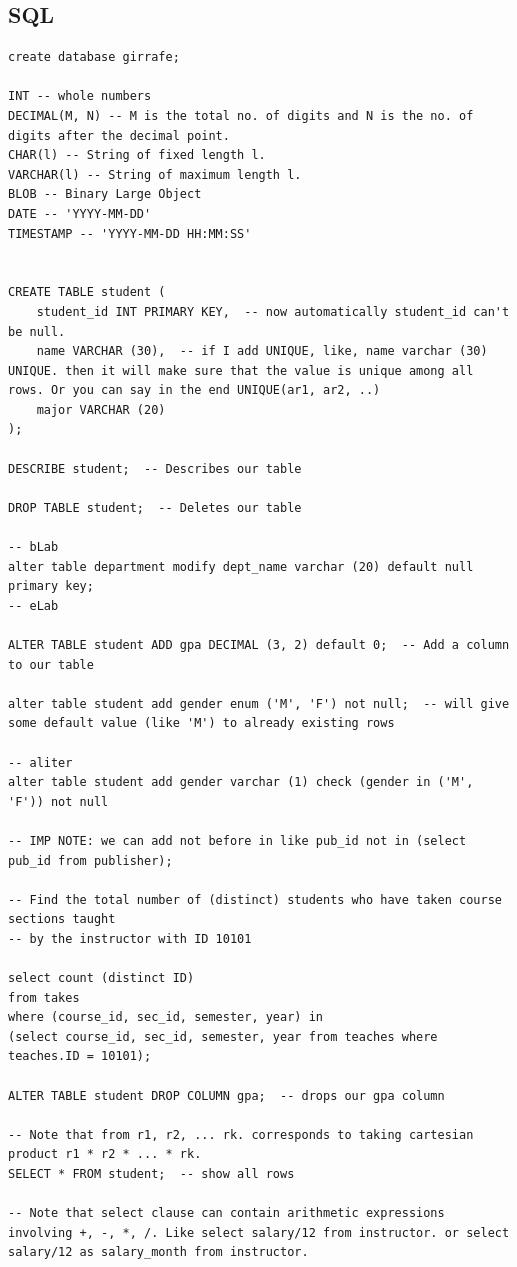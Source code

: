 \documentclass[8pt, a4paper, oneside, twocolumn]{extarticle}
\begin{document}
\subsection{SQL}
\begin{verbatim}
create database girrafe;

INT -- whole numbers
DECIMAL(M, N) -- M is the total no. of digits and N is the no. of digits after the decimal point.
CHAR(l) -- String of fixed length l.
VARCHAR(l) -- String of maximum length l.
BLOB -- Binary Large Object
DATE -- 'YYYY-MM-DD'
TIMESTAMP -- 'YYYY-MM-DD HH:MM:SS'


CREATE TABLE student (
    student_id INT PRIMARY KEY,  -- now automatically student_id can't be null.
    name VARCHAR (30),  -- if I add UNIQUE, like, name varchar (30) UNIQUE. then it will make sure that the value is unique among all rows. Or you can say in the end UNIQUE(ar1, ar2, ..)
    major VARCHAR (20)
);

DESCRIBE student;  -- Describes our table

DROP TABLE student;  -- Deletes our table

-- bLab
alter table department modify dept_name varchar (20) default null primary key;
-- eLab

ALTER TABLE student ADD gpa DECIMAL (3, 2) default 0;  -- Add a column to our table

alter table student add gender enum ('M', 'F') not null;  -- will give some default value (like 'M') to already existing rows

-- aliter
alter table student add gender varchar (1) check (gender in ('M', 'F')) not null

-- IMP NOTE: we can add not before in like pub_id not in (select pub_id from publisher);

-- Find the total number of (distinct) students who have taken course sections taught
-- by the instructor with ID 10101

select count (distinct ID)
from takes
where (course_id, sec_id, semester, year) in
(select course_id, sec_id, semester, year from teaches where teaches.ID = 10101);

ALTER TABLE student DROP COLUMN gpa;  -- drops our gpa column

-- Note that from r1, r2, ... rk. corresponds to taking cartesian product r1 * r2 * ... * rk.
SELECT * FROM student;  -- show all rows

-- Note that select clause can contain arithmetic expressions involving +, -, *, /. Like select salary/12 from instructor. or select salary/12 as salary_month from instructor.


\end{verbatim}
\end{document}
